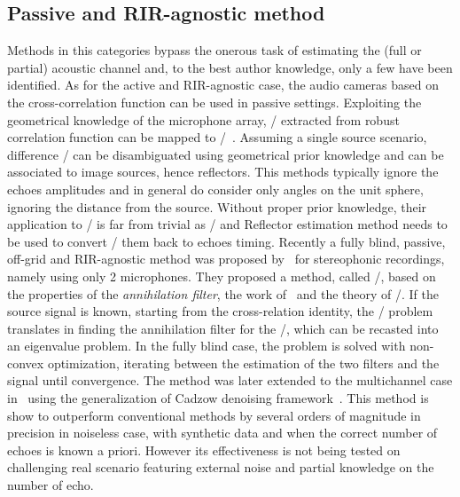 \subsection{Passive and RIR-agnostic method}
Methods in this categories bypass the onerous task of estimating the (full or partial) acoustic channel and, to the best author knowledge, only a few have been identified.
As for the active and RIR-agnostic case, the audio cameras based on the cross-correlation function can be used in passive settings.
Exploiting the geometrical knowledge of the microphone array, \TDOAs/ extracted from robust correlation function can be mapped to \DOAs/~.
Assuming a single source scenario, difference \DOAs/ can be disambiguated using geometrical prior knowledge and can be associated to image sources, hence reflectors.
This methods typically ignore the echoes amplitudes and in general do consider only angles on the unit sphere, ignoring the distance from the source.
Without proper prior knowledge, their application to \AER/ is far from trivial as \RooGE/ and Reflector estimation method needs to be used to convert \DOAs/ them back to echoes timing.
\mynewline
Recently a fully blind, passive, off-grid and RIR-agnostic method was proposed by~\citeauthor{tukuljac2018mulan} for stereophonic recordings, namely using only 2 microphones.
They proposed a method, called \MULAN/, based on the properties of the \textit{annihilation filter},
 the work of~ and the theory of \FRI/.
If the source signal is known, starting from the cross-relation identity, the \AER/ problem translates in finding the annihilation filter for the \RIRs/, which can be recasted into an eigenvalue problem.
In the fully blind case, the problem is solved with non-convex optimization, iterating between the estimation of the two filters and the signal until convergence.
The method was later extended to the multichannel case in~ using the generalization of Cadzow denoising framework~.
This method is show to outperform conventional methods by several orders of magnitude in precision in noiseless case, with synthetic data and when the correct number of echoes is known a priori.
However its effectiveness is not being tested on challenging real scenario featuring external noise and partial knowledge on the number of echo.



